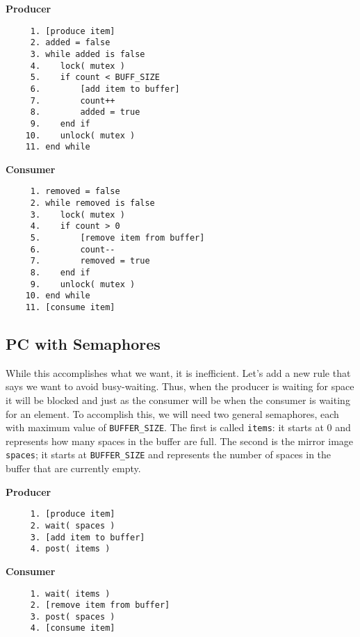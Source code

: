 \begin{multicols}{2}
	\textbf{Producer}\vspace{-2em}
	\begin{verbatim}
	 1. [produce item]
	 2. added = false
	 3. while added is false
	 4.    lock( mutex )
	 5.    if count < BUFF_SIZE
	 6.        [add item to buffer]
	 7.        count++
	 8.        added = true
	 9.    end if
	10.    unlock( mutex )
	11. end while
  \end{verbatim}
	\columnbreak
	\textbf{Consumer}\vspace{-2em}
	\begin{verbatim}
	 1. removed = false
	 2. while removed is false
	 3.    lock( mutex )
	 4.    if count > 0
	 5.        [remove item from buffer]
	 6.        count--
	 7.        removed = true
	 8.    end if
	 9.    unlock( mutex )
	10. end while
	11. [consume item]
  \end{verbatim}
\end{multicols}
\vspace{-2em}


\subsection*{PC with Semaphores}

While this accomplishes what we want, it is inefficient. Let's add a new rule that says we want to avoid busy-waiting. Thus, when the producer is waiting for space it will be blocked and just as the consumer will be when the consumer is waiting for an element. To accomplish this, we will need two general semaphores, each with maximum value of \texttt{BUFFER\_SIZE}. The first is called \texttt{items}: it starts at 0 and represents how many spaces in the buffer are full. The second is the mirror image \texttt{spaces}; it starts at \texttt{BUFFER\_SIZE} and represents the number of spaces in the buffer that are currently empty.

\begin{multicols}{2}
	\textbf{Producer}\vspace{-2em}
	\begin{verbatim}
	 1. [produce item]
	 2. wait( spaces )
	 3. [add item to buffer]
	 4. post( items )
  \end{verbatim}
	\columnbreak
	\textbf{Consumer}\vspace{-2em}
	\begin{verbatim}
	 1. wait( items )
	 2. [remove item from buffer]
	 3. post( spaces )
	 4. [consume item]
  \end{verbatim}
\end{multicols}
\vspace{-2em}

